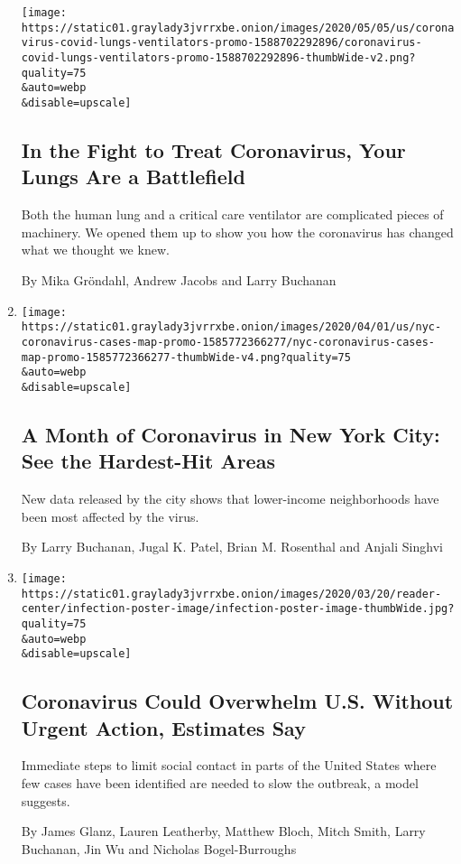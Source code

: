 \begin{enumerate}
  \texttt{[image: https://static01.graylady3jvrrxbe.onion/images/2020/05/05/us/coronavirus-covid-lungs-ventilators-promo-1588702292896/coronavirus-covid-lungs-ventilators-promo-1588702292896-thumbWide-v2.png?quality=75\\\&auto=webp\\\&disable=upscale]}

  \hypertarget{in-the-fight-to-treat-coronavirus-your-lungs-are-a-battlefield}{%
  \subsection{In the Fight to Treat Coronavirus, Your Lungs Are a
  Battlefield}\label{in-the-fight-to-treat-coronavirus-your-lungs-are-a-battlefield}}

  Both the human lung and a critical care ventilator are complicated
  pieces of machinery. We opened them up to show you how the coronavirus
  has changed what we thought we knew.

  By Mika Gröndahl, Andrew Jacobs and Larry Buchanan
\item
  \href{/interactive/2020/04/01/nyregion/nyc-coronavirus-cases-map.html}{}

  \texttt{[image: https://static01.graylady3jvrrxbe.onion/images/2020/04/01/us/nyc-coronavirus-cases-map-promo-1585772366277/nyc-coronavirus-cases-map-promo-1585772366277-thumbWide-v4.png?quality=75\\\&auto=webp\\\&disable=upscale]}

  \hypertarget{a-month-of-coronavirus-in-new-york-city-see-the-hardest-hit-areas}{%
  \subsection{A Month of Coronavirus in New York City: See the
  Hardest-Hit
  Areas}\label{a-month-of-coronavirus-in-new-york-city-see-the-hardest-hit-areas}}

  New data released by the city shows that lower-income neighborhoods
  have been most affected by the virus.

  By Larry Buchanan, Jugal K. Patel, Brian M. Rosenthal and Anjali
  Singhvi
\item
  \href{/interactive/2020/03/20/us/coronavirus-model-us-outbreak.html}{}

  \texttt{[image: https://static01.graylady3jvrrxbe.onion/images/2020/03/20/reader-center/infection-poster-image/infection-poster-image-thumbWide.jpg?quality=75\\\&auto=webp\\\&disable=upscale]}

  \hypertarget{coronavirus-could-overwhelm-us-without-urgent-action-estimates-say}{%
  \subsection{Coronavirus Could Overwhelm U.S. Without Urgent Action,
  Estimates
  Say}\label{coronavirus-could-overwhelm-us-without-urgent-action-estimates-say}}

  Immediate steps to limit social contact in parts of the United States
  where few cases have been identified are needed to slow the outbreak,
  a model suggests.

  By James Glanz, Lauren Leatherby, Matthew Bloch, Mitch Smith, Larry
  Buchanan, Jin Wu and Nicholas Bogel-Burroughs
\end{enumerate}

